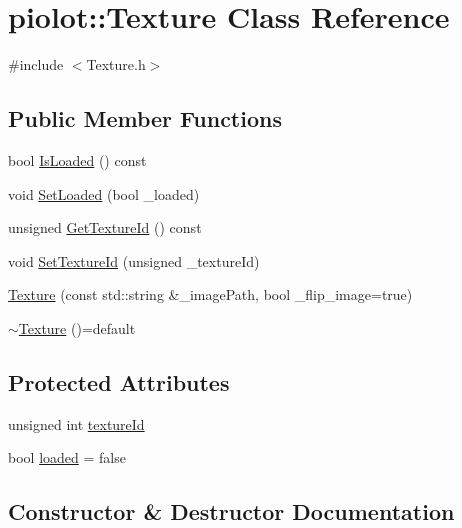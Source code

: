\hypertarget{classpiolot_1_1_texture}{}\section{piolot\+:\+:Texture Class Reference}
\label{classpiolot_1_1_texture}


{\ttfamily \#include $<$Texture.\+h$>$}

\subsection*{Public Member Functions}
\begin{DoxyCompactItemize}
\item 
bool \mbox{\hyperlink{classpiolot_1_1_texture_a059b9fc9103e7e04d189ec7c42b67721}{Is\+Loaded}} () const
\item 
void \mbox{\hyperlink{classpiolot_1_1_texture_aa827eaf24bde9ce9cf31954c81be6c99}{Set\+Loaded}} (bool \+\_\+loaded)
\item 
unsigned \mbox{\hyperlink{classpiolot_1_1_texture_ac169de31ffc45bb37a2702b82ec076b6}{Get\+Texture\+Id}} () const
\item 
void \mbox{\hyperlink{classpiolot_1_1_texture_abb6e33d45d8ba25bc09201edf280a391}{Set\+Texture\+Id}} (unsigned \+\_\+texture\+Id)
\item 
\mbox{\hyperlink{classpiolot_1_1_texture_a37115b1111be3e7b906bc09303fc9864}{Texture}} (const std\+::string \&\+\_\+image\+Path, bool \+\_\+flip\+\_\+image=true)
\item 
\mbox{\hyperlink{classpiolot_1_1_texture_a6fb42c8e2f50a422647c01626b7c6a3a}{$\sim$\+Texture}} ()=default
\end{DoxyCompactItemize}
\subsection*{Protected Attributes}
\begin{DoxyCompactItemize}
\item 
unsigned int \mbox{\hyperlink{classpiolot_1_1_texture_a11b86ffd9963a4f9a98e3d70edc14322}{texture\+Id}}
\item 
bool \mbox{\hyperlink{classpiolot_1_1_texture_ae5c1576fdea6556a4d5a0faa0a52a9a8}{loaded}} = false
\end{DoxyCompactItemize}


\subsection{Constructor \& Destructor Documentation}
\mbox{\label{classpiolot_1_1_texture_a37115b1111be3e7b906bc09303fc9864}} 
